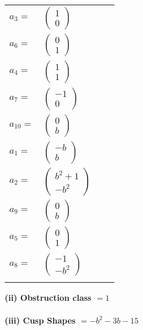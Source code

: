 \documentclass[1p]{elsarticle_modified}
\theoremstyle{definition}
\begin{document}
\begin{tabular}{m{7pt} m{180pt} m{7pt} m{180pt} }
\flushright $a_{3}=$&$\begin{pmatrix}1\\0\end{pmatrix}$ \\
\flushright $a_{6}=$&$\begin{pmatrix}0\\1\end{pmatrix}$ \\
\flushright $a_{4}=$&$\begin{pmatrix}1\\1\end{pmatrix}$ \\
\flushright $a_{7}=$&$\begin{pmatrix}-1\\0\end{pmatrix}$ \\
\flushright $a_{10}=$&$\begin{pmatrix}0\\b\end{pmatrix}$ \\
\flushright $a_{1}=$&$\begin{pmatrix}- b\\b\end{pmatrix}$ \\
\flushright $a_{2}=$&$\begin{pmatrix}b^2+1\\- b^2\end{pmatrix}$ \\
\flushright $a_{9}=$&$\begin{pmatrix}0\\b\end{pmatrix}$ \\
\flushright $a_{5}=$&$\begin{pmatrix}0\\1\end{pmatrix}$ \\
\flushright $a_{8}=$&$\begin{pmatrix}-1\\- b^2\end{pmatrix}$\\&\end{tabular}
\flushleft \textbf{(ii) Obstruction class $= 1$}\\~\\
\flushleft \textbf{(iii) Cusp Shapes $= - b^2-3 b-15$}\\~\\
\end{document}
